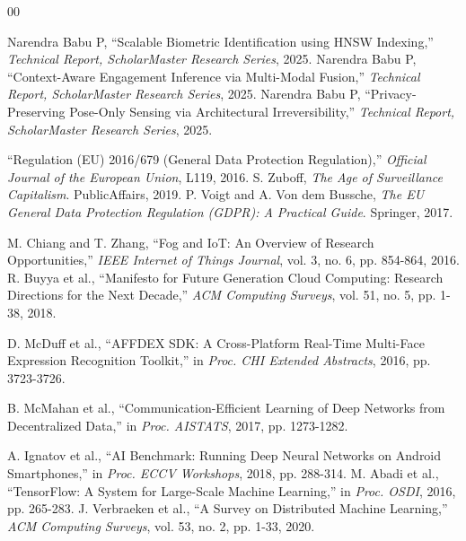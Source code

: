 \documentclass[conference]{IEEEtran}
\begin{document}
\begin{thebibliography}{00}

 Narendra Babu P, ``Scalable Biometric Identification using HNSW Indexing,'' \textit{Technical Report, ScholarMaster Research Series}, 2025.
 Narendra Babu P, ``Context-Aware Engagement Inference via Multi-Modal Fusion,'' \textit{Technical Report, ScholarMaster Research Series}, 2025.
 Narendra Babu P, ``Privacy-Preserving Pose-Only Sensing via Architectural Irreversibility,'' \textit{Technical Report, ScholarMaster Research Series}, 2025.

 ``Regulation (EU) 2016/679 (General Data Protection Regulation),'' \textit{Official Journal of the European Union}, L119, 2016.
 S. Zuboff, \textit{The Age of Surveillance Capitalism}. PublicAffairs, 2019.
 P. Voigt and A. Von dem Bussche, \textit{The EU General Data Protection Regulation (GDPR): A Practical Guide}. Springer, 2017.

 M. Chiang and T. Zhang, ``Fog and IoT: An Overview of Research Opportunities,'' \textit{IEEE Internet of Things Journal}, vol. 3, no. 6, pp. 854-864, 2016.
 R. Buyya et al., ``Manifesto for Future Generation Cloud Computing: Research Directions for the Next Decade,'' \textit{ACM Computing Surveys}, vol. 51, no. 5, pp. 1-38, 2018.

 D. McDuff et al., ``AFFDEX SDK: A Cross-Platform Real-Time Multi-Face Expression Recognition Toolkit,'' in \textit{Proc. CHI Extended Abstracts}, 2016, pp. 3723-3726.

 B. McMahan et al., ``Communication-Efficient Learning of Deep Networks from Decentralized Data,'' in \textit{Proc. AISTATS}, 2017, pp. 1273-1282.

 A. Ignatov et al., ``AI Benchmark: Running Deep Neural Networks on Android Smartphones,'' in \textit{Proc. ECCV Workshops}, 2018, pp. 288-314.
 M. Abadi et al., ``TensorFlow: A System for Large-Scale Machine Learning,'' in \textit{Proc. OSDI}, 2016, pp. 265-283.
 J. Verbraeken et al., ``A Survey on Distributed Machine Learning,'' \textit{ACM Computing Surveys}, vol. 53, no. 2, pp. 1-33, 2020.


\end{thebibliography}
\end{document}
